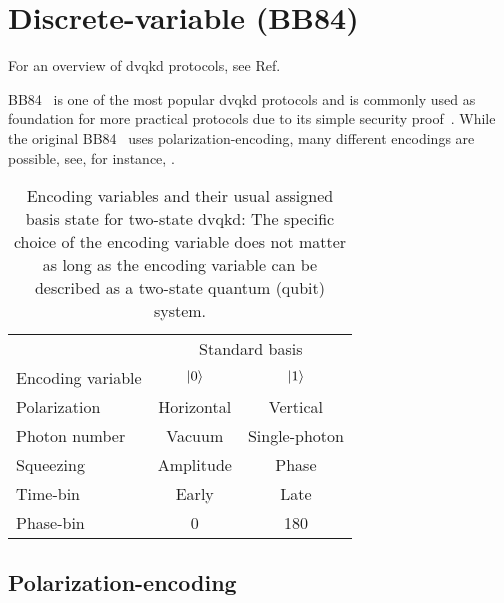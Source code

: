 \section{Discrete-variable (BB84)}


For an overview of \gls{dvqkd} protocols, see Ref.~\cite{Duvsek2006}


BB84~\cite{Bennett1984} is one of the most popular \gls{dvqkd} protocols and is commonly used as foundation for more practical protocols due to its simple security proof~\cite{Shor2000}.
While the original BB84~\cite{Bennett1984} uses polarization-encoding, many different encodings are possible, see, for instance, .
\begin{table}[htb]
	\centering	
	\begin{tabular}{lcc}
		\toprule
		& \multicolumn{2}{c}{Standard basis} \\
		\cmidrule{2-3}
		Encoding variable & $\ket{0}$ & $\ket{1}$ \\
		\midrule
		Polarization & Horizontal & Vertical \\
		Photon number & Vacuum & Single-photon \\
		Squeezing & Amplitude & Phase \\
		Time-bin & Early & Late \\
		Phase-bin & \SI{0}{\deg} & \SI{180}{\deg} \\
		\bottomrule
	\end{tabular}
	\caption{Encoding variables and their usual assigned basis state for two-state \gls{dvqkd}: The specific choice of the encoding variable does not matter as long as the encoding variable can be described as a two-state quantum (qubit) system.}\label{tab:dvqkd_encodings}
\end{table}

\subsection{Polarization-encoding}

